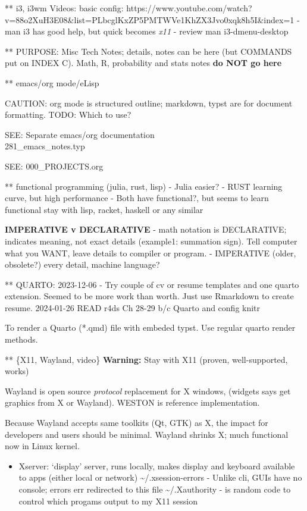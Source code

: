 \documentclass[
]{report}
\providecommand{\tightlist}{%
  \setlength{\itemsep}{0pt}\setlength{\parskip}{0pt}}\usepackage{longtable,booktabs,array}
\begin{document}
** i3, i3wm Videos: basic config:
https://www.youtube.com/watch?v=88o2XuH3E08\&list=PLbcglKxZP5PMTWVe1KhZX3Jvo0xqk8h5I\&index=1
- man i3 has good help, but quick becomes \emph{x11} - review man
i3-dmenu-desktop

** PURPOSE: Misc Tech Notes; details, notes can be here (but COMMANDS
put on INDEX C). Math, R, probability and stats notes \textbf{do NOT go
here}

** emacs/org mode/eLisp

CAUTION: org mode is structured outline; markdown, typst are for
document formatting. TODO: Which to use?

SEE: Separate emacs/org documentation\\
281\_emacs\_notes.typ

SEE: 000\_PROJECTS.org

** functional programming (julia, rust, lisp) - Julia easier? - RUST
learning curve, but high performance - Both have functional?, but seems
to learn functional stay with lisp, racket, haskell or any similar

\textbf{IMPERATIVE v DECLARATIVE} - math notation is DECLARATIVE;
indicates meaning, not exact details (example1: summation sign). Tell
computer what you WANT, leave details to compiler or program. -
IMPERATIVE (older, obsolete?) every detail, machine language?

** QUARTO: 2023-12-06 - Try couple of cv or resume templates and one
quarto extension. Seemed to be more work than worth. Just use Rmarkdown
to create resume. 2024-01-26 READ r4ds Ch 28-29 b/c Quarto and config
knitr

To render a Quarto (*.qmd) file with embeded typst. Use regular quarto
render methods.

** \{X11, Wayland, video\} \textbf{Warning:} Stay with X11 (proven,
well-supported, works)

Wayland is open source \emph{protocol} replacement for X windows,
(widgets says get graphics from X or Wayland). WESTON is reference
implementation.

Because Wayland accepts same toolkits (Qt, GTK) as X, the impact for
developers and users should be minimal. Wayland shrinks X; much
functional now in Linux kernel.

\begin{itemize}
\tightlist
\item
  Xserver: `display' server, runs locally, makes display and keyboard
  available to apps (either local or network)
  \textasciitilde/.xsession-errors - Unlike cli, GUIs have no console;
  errors err redirected to this file \textasciitilde/.Xauthority - is
  random code to control which progams output to my X11 session
\end{itemize}
\end{document}
